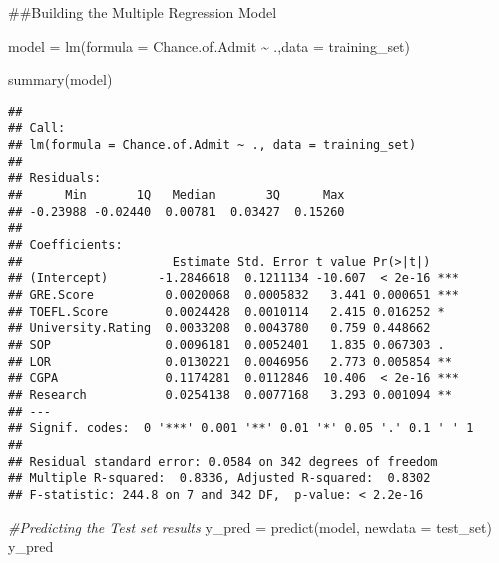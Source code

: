 \documentclass[
]{article}
\newenvironment{Shaded}{\begin{snugshade}}{\end{snugshade}}
\newcommand{\AttributeTok}[1]{\textcolor[rgb]{0.77,0.63,0.00}{#1}}
\newcommand{\CommentTok}[1]{\textcolor[rgb]{0.56,0.35,0.01}{\textit{#1}}}
\newcommand{\FunctionTok}[1]{\textcolor[rgb]{0.00,0.00,0.00}{#1}}
\newcommand{\NormalTok}[1]{#1}
\newcommand{\OtherTok}[1]{\textcolor[rgb]{0.56,0.35,0.01}{#1}}
\newcommand{\SpecialCharTok}[1]{\textcolor[rgb]{0.00,0.00,0.00}{#1}}
\begin{document}
\#\#Building the Multiple Regression Model

\begin{Shaded}
\begin{Highlighting}[]
\NormalTok{model }\OtherTok{=} \FunctionTok{lm}\NormalTok{(}\AttributeTok{formula =}\NormalTok{ Chance.of.Admit }\SpecialCharTok{\textasciitilde{}}\NormalTok{ .,}\AttributeTok{data =}\NormalTok{ training\_set)}

\FunctionTok{summary}\NormalTok{(model)}
\end{Highlighting}
\end{Shaded}

\begin{verbatim}
## 
## Call:
## lm(formula = Chance.of.Admit ~ ., data = training_set)
## 
## Residuals:
##      Min       1Q   Median       3Q      Max 
## -0.23988 -0.02440  0.00781  0.03427  0.15260 
## 
## Coefficients:
##                     Estimate Std. Error t value Pr(>|t|)    
## (Intercept)       -1.2846618  0.1211134 -10.607  < 2e-16 ***
## GRE.Score          0.0020068  0.0005832   3.441 0.000651 ***
## TOEFL.Score        0.0024428  0.0010114   2.415 0.016252 *  
## University.Rating  0.0033208  0.0043780   0.759 0.448662    
## SOP                0.0096181  0.0052401   1.835 0.067303 .  
## LOR                0.0130221  0.0046956   2.773 0.005854 ** 
## CGPA               0.1174281  0.0112846  10.406  < 2e-16 ***
## Research           0.0254138  0.0077168   3.293 0.001094 ** 
## ---
## Signif. codes:  0 '***' 0.001 '**' 0.01 '*' 0.05 '.' 0.1 ' ' 1
## 
## Residual standard error: 0.0584 on 342 degrees of freedom
## Multiple R-squared:  0.8336, Adjusted R-squared:  0.8302 
## F-statistic: 244.8 on 7 and 342 DF,  p-value: < 2.2e-16
\end{verbatim}

\begin{Shaded}
\begin{Highlighting}[]
\CommentTok{\#Predicting the Test set results}
\NormalTok{y\_pred }\OtherTok{=} \FunctionTok{predict}\NormalTok{(model, }\AttributeTok{newdata =}\NormalTok{ test\_set)}
\NormalTok{y\_pred}
\end{Highlighting}
\end{Shaded}
\end{document}
